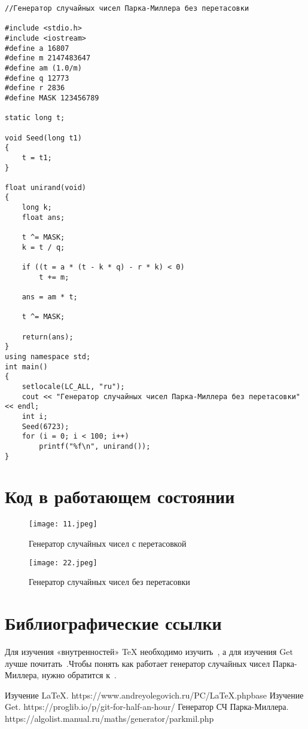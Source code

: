 \documentclass[12pt,a4paper]{scrartcl}
\begin{document}
\begin{verbatim}
//Генератор случайных чисел Парка-Миллера без перетасовки

#include <stdio.h>
#include <iostream>
#define a 16807
#define m 2147483647
#define am (1.0/m)
#define q 12773
#define r 2836
#define MASK 123456789

static long t;

void Seed(long t1)
{
	t = t1;
}

float unirand(void)
{
	long k;
	float ans;

	t ^= MASK;
	k = t / q;

	if ((t = a * (t - k * q) - r * k) < 0)
		t += m;

	ans = am * t;

	t ^= MASK;

	return(ans);
}
using namespace std;
int main()
{
	setlocale(LC_ALL, "ru");
	cout << "Генератор случайных чисел Парка-Миллера без перетасовки" << endl;
	int i;
	Seed(6723);
	for (i = 0; i < 100; i++)
		printf("%f\n", unirand());
}
\end{verbatim}


\section{Код в работающем состоянии}
\label{sec:picexample}
\begin{figure}[h]
	\centering
	\texttt{[image: 11.jpeg]}
	\caption{Генератор случайных чисел с перетасовкой}\label{fig:par}
\end{figure}
\label{sec:picexample}
\begin{figure}[h]
	\centering
	\texttt{[image: 22.jpeg]}
	\caption{Генератор случайных чисел без перетасовки}\label{fig:par}
\end{figure}

\section{Библиографические ссылки}

Для изучения «внутренностей» \TeX{} необходимо 
изучить~\cite{andreyolegovich}, а для изучения Get лучше
почитать~\cite{proglib.io}.Чтобы понять как работает генератор случайных чисел Парка-Миллера, нужно обратится к~\cite{q}. 

\begin{thebibliography}{9}
Изучение \LaTeX{}. https://www.andreyolegovich.ru/PC/LaTeX.phpbase
Изучение Get. https://proglib.io/p/git-for-half-an-hour/    
Генератор СЧ Парка-Миллера. https://algolist.manual.ru/maths/generator/parkmil.php
\end{thebibliography}
\end{document}
